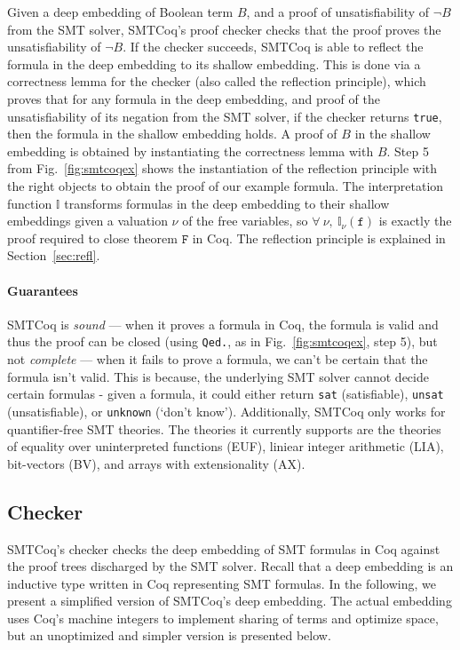 \documentclass{article}
\begin{document}
	Given a deep embedding of 
	Boolean term $B$, and a proof of 
	unsatisfiability of $\neg B$
	from the SMT solver, SMTCoq's proof 
	checker checks that the proof proves
	the unsatisfiability of $\neg B$. If the 
	checker succeeds, SMTCoq is able to 
	reflect the formula in 
	the deep embedding to its shallow 
	embedding. This is done via a 
	correctness lemma for the checker
	(also called the reflection principle),
	which proves that for any 
	formula in the deep embedding, and 
	proof of the unsatisfiability of its 
	negation from the SMT solver, if 
	the checker returns \texttt{true}, 
	then the formula in 
	the shallow embedding holds. A 
	proof of $B$ in the shallow 
	embedding is obtained by instantiating 
	the correctness lemma with $B$.
	Step 5 from Fig.~\ref{fig:smtcoqex} 
	shows the instantiation of 
	the reflection principle with 
	the right objects to obtain the 
	proof of our example formula. 
	The interpretation function
	$\mathbb{I}$ transforms 
	formulas in the deep embedding
	to their shallow embeddings
	given a valuation $\nu$ of the 
	free variables, so 
	$\forall\ \nu,\ 
	\mathbb{I}_{\nu}(\texttt{f})$
	is exactly the proof required 
	to close theorem $\texttt{F}$
	in Coq. The reflection principle 
	is explained in Section~\ref{sec:refl}.	
	
	\paragraph{Guarantees}
	SMTCoq is \textit{sound} ---
	when it proves a formula in Coq, the 
	formula is valid and thus the proof
	can be closed (using \texttt{Qed.},
	as in Fig.~\ref{fig:smtcoqex}, 
	step 5), but 
	not \textit{complete} --- when it 
	fails to prove a formula, we can't 
	be certain that the formula isn't 
	valid. This is because, the underlying 
	SMT solver cannot decide certain 
	formulas - given a formula, it could 
	either return \texttt{sat} 
	(satisfiable), \texttt{unsat} 
	(unsatisfiable), or 
	\texttt{unknown} (`don't know').
	Additionally, SMTCoq only works for 
	quantifier-free SMT theories. The 
	theories it currently supports 
	are the theories of equality over
	uninterpreted functions (EUF), 
	liniear integer arithmetic (LIA),
	bit-vectors (BV), and arrays with
	extensionality (AX).
	
	\subsection{Checker}
	\label{sec:checker}
	SMTCoq's checker checks the deep embedding
	of SMT formulas in Coq against the 
	proof trees discharged by the SMT solver.
	Recall that a deep embedding is an
	inductive type written in 
	Coq representing SMT formulas. 
	In the following, we present 
	a simplified version of SMTCoq's 
	deep embedding. The actual embedding 
	uses Coq's machine integers to 
	implement sharing of terms and 
	optimize space, but an unoptimized 
	and simpler version is presented 
	below. 
	
\end{document}
